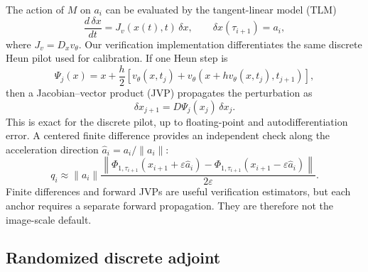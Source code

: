 The action of $M$ on $a_i$ can be evaluated by the tangent-linear model (TLM)
\begin{equation}
  \frac{d\,\delta x}{dt}
  =J_v(x(t),t)\,\delta x,
  \qquad
  \delta x(\tau_{i+1})=a_i,
  \label{eq:tangent-linear-model}
\end{equation}
where $J_v=D_xv_\theta$. Our verification implementation differentiates the same discrete Heun
pilot used for calibration. If one Heun step is
\begin{equation}
  \Psi_j(x)
  =x+\frac{h}{2}\left[
    v_\theta(x,t_j)
    +v_\theta\!\left(x+h v_\theta(x,t_j),t_{j+1}\right)
  \right],
  \label{eq:discrete-heun-step}
\end{equation}
then a Jacobian--vector product (JVP) propagates the perturbation as
\begin{equation}
  \delta x_{j+1}=D\Psi_j(x_j)\,\delta x_j.
  \label{eq:discrete-heun-tangent}
\end{equation}
This is exact for the discrete pilot, up to floating-point and autodifferentiation error. A
centered finite difference provides an independent check along the acceleration direction
$\widehat a_i=a_i/\lVert a_i\rVert$:
\begin{equation}
  q_i
  \approx
  \lVert a_i\rVert
  \frac{\left\lVert
    \Phi_{1,\tau_{i+1}}(x_{i+1}+\varepsilon\widehat a_i)
    -\Phi_{1,\tau_{i+1}}(x_{i+1}-\varepsilon\widehat a_i)
  \right\rVert}{2\varepsilon}.
  \label{eq:transport-finite-difference}
\end{equation}
Finite differences and forward JVPs are useful verification estimators, but each anchor requires a
separate forward propagation. They are therefore not the image-scale default.

\subsection{Randomized discrete adjoint}
\label{sec:randomized-adjoint}

